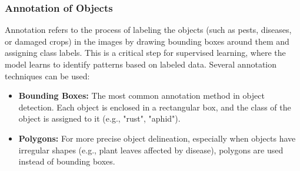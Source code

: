 \subsubsection{Annotation of Objects}
Annotation refers to the process of labeling the objects (such as pests, diseases, or damaged crops) in the images by drawing bounding boxes around them and assigning class labels. This is a critical step for supervised learning, where the model learns to identify patterns based on labeled data. Several annotation techniques can be used:
\begin{itemize}
    \item \textbf{Bounding Boxes:} The most common annotation method in object detection. Each object is enclosed in a rectangular box, and the class of the object is assigned to it (e.g., "rust", "aphid").
    \item \textbf{Polygons:} For more precise object delineation, especially when objects have irregular shapes (e.g., plant leaves affected by disease), polygons are used instead of bounding boxes.
\end{itemize}

